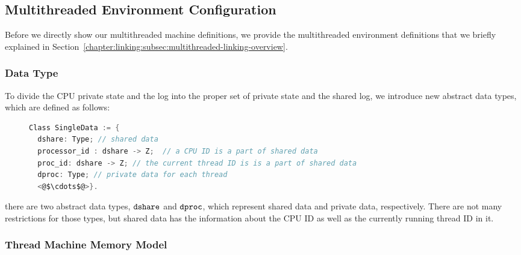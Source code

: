 
\subsection{Multithreaded Environment Configuration}
\label{chapter:linking:subsec:multithreaded-env-configuration}

Before we directly show our multithreaded machine definitions, 
we provide the multithreaded environment definitions that we briefly explained in Section~\ref{chapter:linking:subsec:multithreaded-linking-overview}.
%

\subsubsection{Data Type} 

To divide the CPU private state and the log into the proper set of private state and the shared log, we introduce 
new abstract data types, which are defined as follows:
\begin{figure}
\begin{lstlisting}[language=C, morekeywords={Class}]
Class SingleData := {
  dshare: Type; // shared data    
  processor_id : dshare -> Z;  // a CPU ID is a part of shared data
  proc_id: dshare -> Z; // the current thread ID is is a part of shared data
  dproc: Type; // private data for each thread
  <@$\cdots$@>}.
\end{lstlisting} 
\end{figure}
there are two abstract data types, ${\mathrm{\texttt{dshare}}}$ and ${\mathrm{\texttt{dproc}}}$, 
which represent shared data and private data, respectively. 
There are not many restrictions for those types,
but shared data has the information about the CPU ID as well as the currently running thread ID in it.


\subsubsection{Thread Machine Memory Model}


